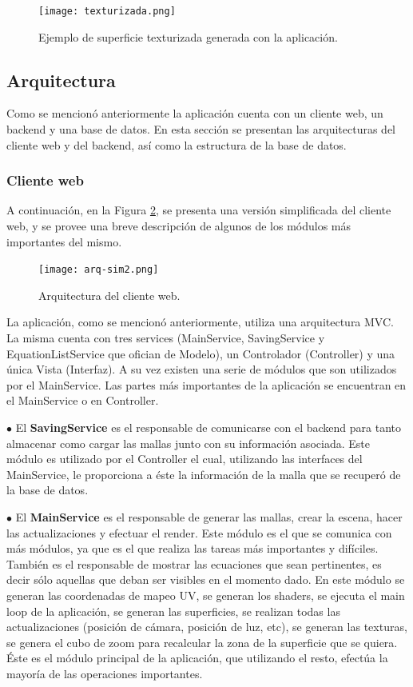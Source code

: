 \documentclass[12pt]{article}
\begin{document}
\begin{figure}[h!]
\texttt{[image: texturizada.png]}
\caption{Ejemplo de superficie texturizada generada con la aplicación.}
\label{sackboy}
\end{figure}

\clearpage
\subsection{Arquitectura}
\noindent Como se mencionó anteriormente la aplicación cuenta con un cliente web, un backend y una base de datos. En esta sección se presentan las arquitecturas del cliente web y del backend, así como la estructura de la base de datos.
\subsubsection{Cliente web}
\noindent A continuación, en la Figura \ref{arq}, se presenta una versión simplificada del cliente web, y se provee una breve descripción de algunos de los módulos más importantes del mismo.

\begin{figure}[h!]
\texttt{[image: arq-sim2.png]}
\caption{Arquitectura del cliente web.}
\label{arq}
\end{figure}

La aplicación, como se mencionó anteriormente, utiliza una arquitectura MVC. La misma  cuenta con tres services (MainService, SavingService y EquationListService que ofician de Modelo), un Controlador (Controller) y una única Vista (Interfaz). A su vez existen una serie de módulos que son utilizados por el MainService. Las partes más importantes de la aplicación se encuentran en el MainService o en Controller.

$\bullet$ El \textbf{SavingService} es el responsable de comunicarse con el backend para tanto almacenar como cargar las mallas junto con su información asociada. Este módulo es utilizado por el Controller el cual, utilizando las interfaces del MainService, le proporciona a éste la información de la malla que se recuperó de la base de datos.

$\bullet$ El \textbf{MainService} es el responsable de generar las mallas, crear la escena, hacer las actualizaciones y efectuar el render. Este módulo es el que se comunica con más módulos, ya que es el que realiza las tareas más importantes y difíciles. También es el responsable de mostrar las ecuaciones que sean pertinentes, es decir sólo aquellas que deban ser visibles en el momento dado. En este módulo se generan las coordenadas de mapeo UV, se generan los shaders, se ejecuta el main loop de la aplicación, se generan las superficies, se realizan todas las actualizaciones (posición de cámara, posición de luz, etc), se generan las texturas, se genera el cubo de zoom para recalcular la zona de la superficie que se quiera. Éste es el módulo principal de la aplicación, que utilizando el resto, efectúa la mayoría de las operaciones importantes.
\end{document}

